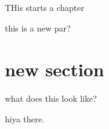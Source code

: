 THis starts a chapter

this is a new par?

\section{new section}
what does this look like?

hiya there.